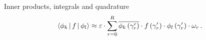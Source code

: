 \begin{chapter}{Inner products, integrals and quadrature}
\begin{equation} \label{eq:homogeneous_quadrature_rule}
\begin{split}
  \Braket{\phi_k | f | \phi_l}
  \approx
  \varepsilon \cdot \sum_{r=0}^R \overline{\phi_k\left( \gamma_r^\prime \right)} \cdot f\left( \gamma_r^\prime \right) \cdot \phi_l\left( \gamma_r^\prime \right) \cdot \omega_r \,.
\end{split}
\end{equation}

\end{chapter}
